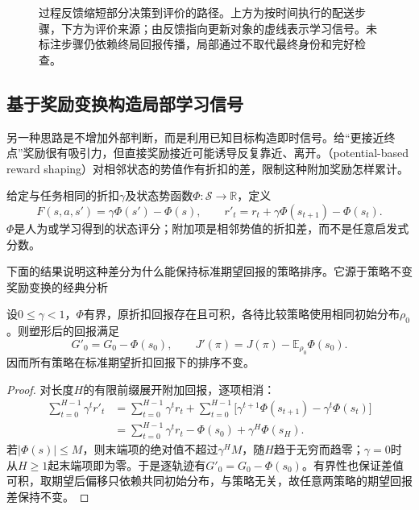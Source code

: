 \begin{figure}[htbp]
  \centering
  
  \caption{过程反馈缩短部分决策到评价的路径。上方为按时间执行的配送步骤，下方为评价来源；由反馈指向更新对象的虚线表示学习信号。未标注步骤仍依赖终局回报传播，局部通过不取代最终身份和完好检查。}
  \label{fig:rl-reward-process}
\end{figure}

\subsection{基于奖励变换构造局部学习信号}
\label{sec:rl-reward-shaping}

另一种思路是不增加外部判断，而是利用已知目标构造即时信号。给“更接近终点”奖励很有吸引力，但直接奖励接近可能诱导反复靠近、离开。（potential-based reward shaping）对相邻状态的势值作有折扣的差，限制这种附加奖励怎样累计。

\begin{definition}[潜势型塑形]
  \label{def:rl-reward-shaping}
  给定与任务相同的折扣$\gamma$及状态势函数$\Phi:\mathcal S\to\mathbb R$，定义
  \[
    F(s,a,s')=\gamma\Phi(s')-\Phi(s),\qquad
    r'_t=r_t+\gamma\Phi(s_{t+1})-\Phi(s_t).
  \]
  $\Phi$是人为或学习得到的状态评分；附加项是相邻势值的折扣差，而不是任意启发式分数。
\end{definition}

下面的结果说明这种差分为什么能保持标准期望回报的策略排序。它源于策略不变奖励变换的经典分析

\begin{theorem}[无限折扣时域的塑形不变性]
  \label{thm:rl-reward-shaping}
  设$0\leq\gamma<1$，$\Phi$有界，原折扣回报存在且可积，各待比较策略使用相同初始分布$\rho_0$。则塑形后的回报满足
  \[
    G'_0=G_0-\Phi(s_0),\qquad
    J'(\pi)=J(\pi)-\mathbb E_{\rho_0}\Phi(s_0).
  \]
  因而所有策略在标准期望折扣回报下的排序不变。
\end{theorem}

\begin{proof}
  对长度$H$的有限前缀展开附加回报，逐项相消：
  \begin{align*}
    \sum_{t=0}^{H-1}\gamma^t r'_t
    &=\sum_{t=0}^{H-1}\gamma^t r_t
       +\sum_{t=0}^{H-1}
          \bigl[\gamma^{t+1}\Phi(s_{t+1})
                          -\gamma^t\Phi(s_t)\bigr]\\
    &=\sum_{t=0}^{H-1}\gamma^t r_t
       -\Phi(s_0)+\gamma^H\Phi(s_H).
  \end{align*}
  若$|\Phi(s)|\leq M$，则末端项的绝对值不超过$\gamma^H M$，随$H$趋于无穷而趋零；$\gamma=0$时从$H\geq1$起末端项即为零。于是逐轨迹有$G'_0=G_0-\Phi(s_0)$。有界性也保证差值可积，取期望后偏移只依赖共同初始分布，与策略无关，故任意两策略的期望回报差保持不变。
\end{proof}

